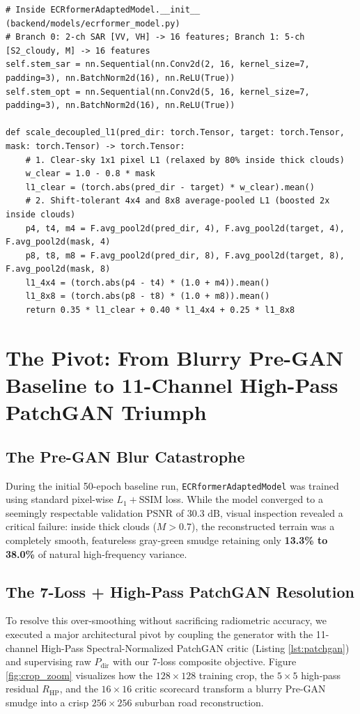 \documentclass[12pt,a4paper]{report}
\begin{document}
\begin{lstlisting}[caption={Decoupled Modality Stem and Scale-Decoupled $L_1$ Loss Implementation},label={lst:stem_loss}]
# Inside ECRformerAdaptedModel.__init__ (backend/models/ecrformer_model.py)
# Branch 0: 2-ch SAR [VV, VH] -> 16 features; Branch 1: 5-ch [S2_cloudy, M] -> 16 features
self.stem_sar = nn.Sequential(nn.Conv2d(2, 16, kernel_size=7, padding=3), nn.BatchNorm2d(16), nn.ReLU(True))
self.stem_opt = nn.Sequential(nn.Conv2d(5, 16, kernel_size=7, padding=3), nn.BatchNorm2d(16), nn.ReLU(True))

def scale_decoupled_l1(pred_dir: torch.Tensor, target: torch.Tensor, mask: torch.Tensor) -> torch.Tensor:
    # 1. Clear-sky 1x1 pixel L1 (relaxed by 80% inside thick clouds)
    w_clear = 1.0 - 0.8 * mask
    l1_clear = (torch.abs(pred_dir - target) * w_clear).mean()
    # 2. Shift-tolerant 4x4 and 8x8 average-pooled L1 (boosted 2x inside clouds)
    p4, t4, m4 = F.avg_pool2d(pred_dir, 4), F.avg_pool2d(target, 4), F.avg_pool2d(mask, 4)
    p8, t8, m8 = F.avg_pool2d(pred_dir, 8), F.avg_pool2d(target, 8), F.avg_pool2d(mask, 8)
    l1_4x4 = (torch.abs(p4 - t4) * (1.0 + m4)).mean()
    l1_8x8 = (torch.abs(p8 - t8) * (1.0 + m8)).mean()
    return 0.35 * l1_clear + 0.40 * l1_4x4 + 0.25 * l1_8x8
\end{lstlisting}

\section{The Pivot: From Blurry Pre-GAN Baseline to 11-Channel High-Pass PatchGAN Triumph}
\subsection{The Pre-GAN Blur Catastrophe}
During the initial 50-epoch baseline run, \texttt{ECRformerAdaptedModel} was trained using standard pixel-wise $L_1 + \text{SSIM}$ loss. While the model converged to a seemingly respectable validation PSNR of $30.3\text{ dB}$, visual inspection revealed a critical failure: inside thick clouds ($M > 0.7$), the reconstructed terrain was a completely smooth, featureless gray-green smudge retaining only \textbf{13.3\% to 38.0\%} of natural high-frequency variance.

\subsection{The 7-Loss + High-Pass PatchGAN Resolution}
To resolve this over-smoothing without sacrificing radiometric accuracy, we executed a major architectural pivot by coupling the generator with the 11-channel High-Pass Spectral-Normalized PatchGAN critic (Listing \ref{lst:patchgan}) and supervising raw $P_{\text{dir}}$ with our 7-loss composite objective. Figure \ref{fig:crop_zoom} visualizes how the $128\times 128$ training crop, the $5\times 5$ high-pass residual $R_{\text{HP}}$, and the $16\times 16$ critic scorecard transform a blurry Pre-GAN smudge into a crisp $256\times 256$ suburban road reconstruction.
\end{document}

